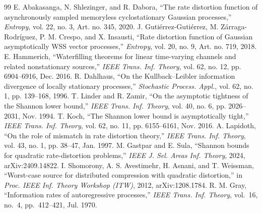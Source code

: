 \documentclass[11pt,onecolumn]{IEEEtran}
\begin{document}
\begin{thebibliography}{99}
 E. Abakasanga, N. Shlezinger, and R. Dabora, ``The
rate distortion function of asynchronously sampled memoryless
cyclostationary Gaussian processes,'' \emph{Entropy}, vol. 22, no. 3,
Art. no. 345, 2020.
 J. Guti\'errez-Guti\'errez,
M. Z\'arraga-Rodr\'iguez, P. M. Crespo, and X. Insausti, ``Rate distortion
function of Gaussian asymptotically WSS vector processes,''
\emph{Entropy}, vol. 20, no. 9, Art. no. 719, 2018.
 E. Hammerich, ``Waterfilling theorems for linear
time-varying channels and related nonstationary sources,'' \emph{IEEE
Trans. Inf. Theory}, vol. 62, no. 12, pp. 6904--6916, Dec. 2016.
 R. Dahlhaus, ``On the Kullback--Leibler information
divergence of locally stationary processes,'' \emph{Stochastic Process.
Appl.}, vol. 62, no. 1, pp. 139--168, 1996.
 T. Linder and R. Zamir, ``On the asymptotic tightness
of the Shannon lower bound,'' \emph{IEEE Trans. Inf. Theory}, vol. 40,
no. 6, pp. 2026--2031, Nov. 1994.
 T. Koch, ``The Shannon lower bound is asymptotically
tight,'' \emph{IEEE Trans. Inf. Theory}, vol. 62, no. 11, pp. 6155--6161,
Nov. 2016.
 A. Lapidoth, ``On the role of mismatch in rate
distortion theory,'' \emph{IEEE Trans. Inf. Theory}, vol. 43, no. 1,
pp. 38--47, Jan. 1997.
 M. Gastpar and E. Sula, ``Shannon bounds for
quadratic rate-distortion problems,'' \emph{IEEE J. Sel. Areas Inf.
Theory}, 2024, arXiv:2409.14822.
 I. Shomorony, A. S. Avestimehr, H. Asnani, and
T. Weissman, ``Worst-case source for distributed compression with
quadratic distortion,'' in \emph{Proc. IEEE Inf. Theory Workshop (ITW)},
2012, arXiv:1208.1784.
 R. M. Gray, ``Information rates of autoregressive
processes,'' \emph{IEEE Trans. Inf. Theory}, vol.~16, no.~4,
pp.~412--421, Jul. 1970.

\end{thebibliography}
\end{document}
